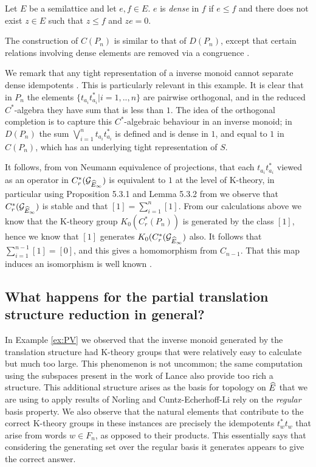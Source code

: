 \begin{example}
\begin{example}
\begin{definition}
Let $E$ be a semilattice and let $e,f \in E$. $e$ is \textit{dense} in $f$ if $e \leq f$ and there does not exist $z \in E$ such that $z \leq f$ and $ze=0$. 
\end{definition}

The construction of $C(P_{n})$ is similar to that of $D(P_{n})$, except that certain relations involving dense elements are removed via a congruence \cite{lawson-2011-1}.

We remark that any tight representation of a inverse monoid cannot separate dense idempotents \cite{MR2419901}. This is particularly relevant in this example. It is clear that in $P_{n}$ the elements $\lbrace t_{a_{i}}t_{a_{i}}^{*} | i = 1,..,n \rbrace$ are pairwise orthogonal, and in the reduced $C^{*}$-algebra they have sum that is less than $1$. The idea of the orthogonal completion is to capture this $C^{*}$-algebraic behaviour in an inverse monoid; in $D(P_{n})$ the sum $\bigvee_{i=1}^{n} t_{a_{i}}t_{a_{i}}^{*}$ is defined and is dense in $1$, and equal to $1$ in $C(P_{n})$, which has an underlying tight representation of $S$. 

It follows, from von Neumann equivalence of projections, that each $t_{a_{i}}t_{a_{i}}^{*}$ viewed as an operator in $C^{*}_{r}(\mathcal{G}_{\widehat{E}_{\infty}})$ is equivalent to $1$ at the level of K-theory, in particular using Proposition 5.3.1 and Lemma 5.3.2 from \cite{MR1222415} we observe that $C^{*}_{r}(\mathcal{G}_{\widehat{E}_{\infty}})$ is stable and that $[1]=\sum_{i=1}^{n}[1]$. From our calculations above we know that the K-theory group $K_{0}(C^{*}_{r}(P_{n}))$ is generated by the class $[1]$, hence we know that $[1]$ generates $K_{0}(C^{*}_{r}(\mathcal{G}_{\widehat{E}_{\infty}})$ also. It follows that $\sum_{i=1}^{n-1}[1]=[0]$, and this gives a homomorphism from $C_{n-1}$. That this map induces an isomorphism is well known \cite{MR2457037}. 

\end{example}

\subsection{What happens for the partial translation structure reduction in general?}

In Example \ref{ex:PV} we observed that the inverse monoid generated by the translation structure had K-theory groups that were relatively easy to calculate but much too large. This phenomenon is not uncommon; the same computation using the subspaces present in the work of Lance \cite{MR723010} also provide too rich a structure. This additional structure arises as the basis for topology on $\widehat{E}$ that we are using to apply results of Norling and Cuntz-Echerhoff-Li rely on the \textit{regular} basis property. We also observe that the natural elements that contribute to the correct K-theory groups in these instances are precisely the idempotents $t_{w}^{*}t_{w}$ that arise from words $w \in F_{n}$, as opposed to their products. This essentially says that considering the generating set over the regular basis it generates appears to give the correct answer.


\end{example}
